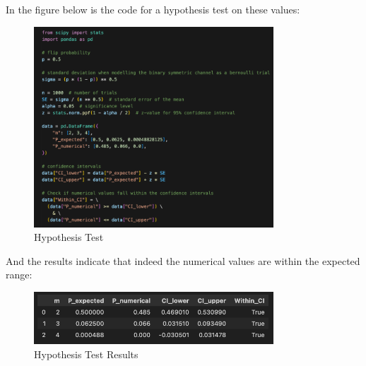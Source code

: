 \documentclass[fleqn]{article}
\begin{document}
  \pagebreak
  In the figure below is the code for a hypothesis test on these values:
  \begin{figure}[ht!]
    \centering
    \includegraphics[width=0.8\textwidth]{../images/hypothesis_test.png}
    \caption{Hypothesis Test}
    \label{fig:hypothesis_test}
\end{figure}

And the results indicate that indeed the numerical values are within the expected range:
\begin{figure}[ht!]
  \centering
  \includegraphics[width=0.8\textwidth]{../images/hypothesis_test_results.png}
  \caption{Hypothesis Test Results}
  \label{fig:hypothesis_test_results}
\end{figure}

  \pagebreak
\end{document}

